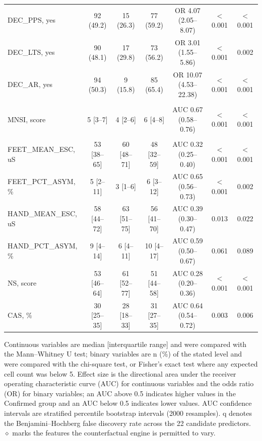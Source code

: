 \begin{table}[!ht]
\begin{tabular}{lcccccc}
DEC\_PPS, yes  & 92 (49.2) & 15 (26.3) & 77 (59.2) & OR 4.07 (2.05--8.07) & $<$0.001 & $<$0.001 \\
DEC\_LTS, yes  & 90 (48.1) & 17 (29.8) & 73 (56.2) & OR 3.01 (1.55--5.86) & $<$0.001 & 0.002 \\
DEC\_AR, yes  & 94 (50.3) & 9 (15.8) & 85 (65.4) & OR 10.07 (4.53--22.38) & $<$0.001 & $<$0.001 \\
\addlinespace
\multicolumn{7}{l}{\textit{MNSI}} \\
MNSI, score  & 5 [3--7] & 4 [2--6] & 6 [4--8] & AUC 0.67 (0.58--0.76) & $<$0.001 & $<$0.001 \\
\addlinespace
\multicolumn{7}{l}{\textit{Sudoscan}} \\
FEET\_MEAN\_ESC, uS  & 53 [38--65] & 60 [48--71] & 48 [32--59] & AUC 0.32 (0.25--0.40) & $<$0.001 & $<$0.001 \\
FEET\_PCT\_ASYM, \%  & 5 [2--11] & 3 [1--6] & 6 [3--12] & AUC 0.65 (0.56--0.73) & $<$0.001 & 0.002 \\
HAND\_MEAN\_ESC, uS  & 58 [44--72] & 63 [51--75] & 56 [41--70] & AUC 0.39 (0.30--0.47) & 0.013 & 0.022 \\
HAND\_PCT\_ASYM, \%  & 9 [4--14] & 6 [4--11] & 10 [4--17] & AUC 0.59 (0.50--0.67) & 0.061 & 0.089 \\
NS, score  & 53 [46--64] & 61 [52--77] & 51 [44--58] & AUC 0.28 (0.20--0.36) & $<$0.001 & $<$0.001 \\
CAS, \%  & 30 [25--35] & 28 [18--33] & 31 [27--35] & AUC 0.64 (0.54--0.72) & 0.003 & 0.006 \\
\bottomrule
\end{tabular}
\begin{flushleft}\footnotesize Continuous variables are median [interquartile range] and were compared with the Mann--Whitney U test; binary variables are n (\%) of the stated level and were compared with the chi-square test, or Fisher's exact test where any expected cell count was below 5. Effect size is the directional area under the receiver operating characteristic curve (AUC) for continuous variables and the odds ratio (OR) for binary variables; an AUC above 0.5 indicates higher values in the Confirmed group and an AUC below 0.5 indicates lower values. AUC confidence intervals are stratified percentile bootstrap intervals (2000 resamples). q denotes the Benjamini--Hochberg false discovery rate across the 22 candidate predictors. $\diamond$ marks the features the counterfactual engine is permitted to vary.\end{flushleft}
\end{table}
